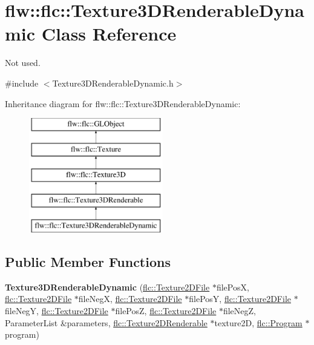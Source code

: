 \hypertarget{classflw_1_1flc_1_1Texture3DRenderableDynamic}{}\section{flw\+:\+:flc\+:\+:Texture3\+D\+Renderable\+Dynamic Class Reference}
\label{classflw_1_1flc_1_1Texture3DRenderableDynamic}


Not used.  




{\ttfamily \#include $<$Texture3\+D\+Renderable\+Dynamic.\+h$>$}

Inheritance diagram for flw\+:\+:flc\+:\+:Texture3\+D\+Renderable\+Dynamic\+:\begin{figure}[H]
\begin{center}
\leavevmode
\includegraphics[height=5.000000cm]{classflw_1_1flc_1_1Texture3DRenderableDynamic}
\end{center}
\end{figure}
\subsection*{Public Member Functions}
\begin{DoxyCompactItemize}
\item 
{\bfseries Texture3\+D\+Renderable\+Dynamic} (\hyperlink{classflw_1_1flc_1_1Texture2DFile}{flc\+::\+Texture2\+D\+File} $\ast$file\+PosX, \hyperlink{classflw_1_1flc_1_1Texture2DFile}{flc\+::\+Texture2\+D\+File} $\ast$file\+NegX, \hyperlink{classflw_1_1flc_1_1Texture2DFile}{flc\+::\+Texture2\+D\+File} $\ast$file\+PosY, \hyperlink{classflw_1_1flc_1_1Texture2DFile}{flc\+::\+Texture2\+D\+File} $\ast$file\+NegY, \hyperlink{classflw_1_1flc_1_1Texture2DFile}{flc\+::\+Texture2\+D\+File} $\ast$file\+PosZ, \hyperlink{classflw_1_1flc_1_1Texture2DFile}{flc\+::\+Texture2\+D\+File} $\ast$file\+NegZ, Parameter\+List \&parameters, \hyperlink{classflw_1_1flc_1_1Texture2DRenderable}{flc\+::\+Texture2\+D\+Renderable} $\ast$texture2D, \hyperlink{classflw_1_1flc_1_1Program}{flc\+::\+Program} $\ast$program)\hypertarget{classflw_1_1flc_1_1Texture3DRenderableDynamic_a4995ffe35befb5c105dffa00e2d8a4ac}{}\label{classflw_1_1flc_1_1Texture3DRenderableDynamic_a4995ffe35befb5c105dffa00e2d8a4ac}

\end{DoxyCompactItemize}
